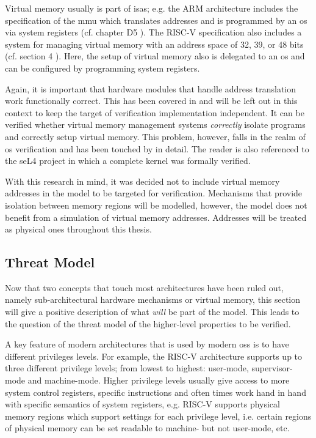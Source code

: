 Virtual memory usually is part of \glspl{isa}; e.g. the ARM architecture includes the specification of the \gls{mmu} which translates addresses and is programmed by an \gls{os} via system registers (cf. chapter D5 \cite{Armv8}).
The RISC-V specification also includes a system for managing virtual memory with an address space of 32, 39, or 48 bits (cf. section 4 \cite{RiscVISAP}).
Here, the setup of virtual memory also is delegated to an \gls{os} and can be configured by programming system registers.

Again, it is important that hardware modules that handle address translation work functionally correct.
This has been covered in \cite{Dalinger05} and will be left out in this context to keep the target of verification implementation independent.
It can be verified whether virtual memory management systems \textit{correctly} isolate programs and correctly setup virtual memory.
This problem, however, falls in the realm of \gls{os} verification and has been touched by \cite{Vaynberg12} in detail.
The reader is also referenced to the seL4 project \cite{Klein09} in which a complete kernel was formally verified.

With this research in mind, it was decided not to include virtual memory addresses in the model to be targeted for verification.
Mechanisms that provide isolation between memory regions will be modelled, however, the model does not benefit from a simulation of virtual memory addresses.
Addresses will be treated as physical ones throughout this thesis.

\subsection{Threat Model}
\label{sec:threat-model}

Now that two concepts that touch most architectures have been ruled out, namely sub-architectural hardware mechanisms or virtual memory, this section will give a positive description of what \textit{will} be part of the model.
This leads to the question of the threat model of the higher-level properties to be verified.

A key feature of modern architectures that is used by modern \glspl{os} is to have different privileges levels.
For example, the RISC-V architecture supports up to three different privilege levels; from lowest to highest: user-mode, supervisor-mode and machine-mode.
Higher privilege levels usually give access to more system control registers, specific instructions and often times work hand in hand with specific semantics of system registers, e.g. RISC-V supports physical memory regions which support settings for each privilege level, i.e. certain regions of physical memory can be set readable to machine- but not user-mode, etc.

